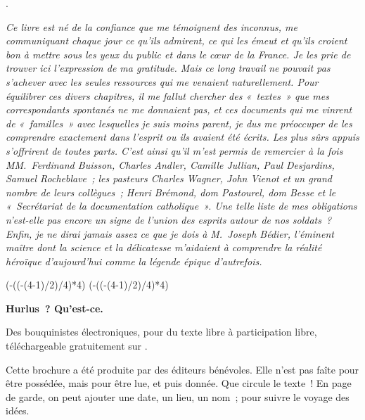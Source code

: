 \documentclass[french,twoside]{book} %
\newcommand{\dateline}[1]{\medskip{\RaggedLeft{#1}\par}\bigskip}
\newcommand\chapterclose{} %
\def\truncdiv#1#2{((#1-(#2-1)/2)/#2)}
\def\moduloop#1#2{(#1-\truncdiv{#1}{#2}*#2)}
\def\modulo#1#2{\number\numexpr\moduloop{#1}{#2}\relax}
\begin{document}
{{} }.‌\par
\par

\dateline{27 novembre 1916/9 mars 1917.‌}
\noindent \par
{\itshape Ce livre est né de la confiance que me témoignent des inconnus, me communiquant chaque jour ce qu’ils admirent, ce qui les émeut et qu’ils croient bon à mettre sous les yeux du public et dans le cœur de la France. Je les prie de trouver ici l’expression de ma gratitude. Mais ce long travail ne pouvait pas s’achever avec les seules ressources qui me venaient naturellement. Pour équilibrer ces divers chapitres, il me fallut chercher des « textes » que mes correspondants spontanés ne me donnaient pas, et ces documents qui me vinrent de « familles » avec lesquelles je suis moins parent, je dus me préoccuper de les comprendre exactement dans l’esprit ou ils avaient été écrits. Les plus sûrs appuis s’offrirent de toutes parts. C’est ainsi qu’il m’est permis de remercier à la fois MM. Ferdinand Buisson, Charles Andler, Camille Jullian, Paul Desjardins, Samuel Rocheblave ; les pasteurs Charles Wagner, John Vienot et un grand nombre de leurs collègues ; Henri Brémond, dom Pastourel, dom Besse et le « Secrétariat de la documentation catholique ». Une telle liste de mes obligations n’est-elle pas encore un signe de l’union des esprits autour de nos soldats ? Enfin, je ne dirai jamais assez ce que je dois à M. Joseph Bédier, l’éminent maître dont la science et la délicatesse m’aidaient à comprendre la réalité héroïque d’aujourd’hui comme la légende épique d’autrefois.‌}
\chapterclose

 


\ifbooklet
  \pagestyle{empty}
  \clearpage
  \ifnum\modulo{\value{page}}{4}=0 \hbox{}\newpage\hbox{}\newpage\fi
  \ifnum\modulo{\value{page}}{4}=1 \hbox{}\newpage\hbox{}\newpage\fi


  \hbox{}\newpage
  \ifodd\value{page}\hbox{}\newpage\fi
  {\centering\color{rubric}\bfseries\noindent\large
    Hurlus ? Qu’est-ce.\par
    \bigskip
  }
  \noindent Des bouquinistes électroniques, pour du texte libre à participation libre,
  téléchargeable gratuitement sur \href{https://hurlus.fr}{}.\par
  \bigskip
  \noindent Cette brochure a été produite par des éditeurs bénévoles.
  Elle n’est pas faîte pour être possédée, mais pour être lue, et puis donnée.
  Que circule le texte !
  En page de garde, on peut ajouter une date, un lieu, un nom ; pour suivre le voyage des idées.
  \par
\end{document}

